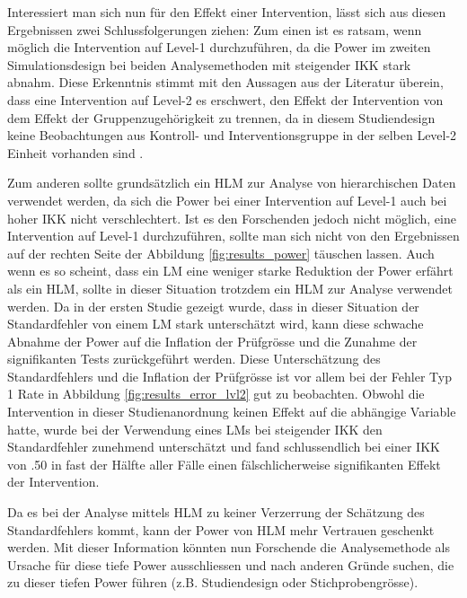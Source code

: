 \documentclass[12pt, a4paper]{article}\usepackage[]{graphicx}\usepackage[]{color}
\begin{document}
Interessiert man sich nun für den Effekt einer Intervention, lässt sich aus diesen Ergebnissen zwei Schlussfolgerungen ziehen: Zum einen ist es ratsam, wenn möglich die Intervention auf Level-1 durchzuführen, da die Power im zweiten Simulationsdesign bei beiden Analysemethoden mit steigender IKK stark abnahm. Diese Erkenntnis stimmt mit den Aussagen aus der Literatur überein, dass eine Intervention auf Level-2 es erschwert, den Effekt der Intervention von dem Effekt der Gruppenzugehörigkeit zu trennen, da in diesem Studiendesign keine Beobachtungen aus Kontroll- und Interventionsgruppe in der selben Level-2 Einheit vorhanden sind \citep{cleary2012studydesign, moerbeek2000design}. 

Zum anderen sollte grundsätzlich ein HLM zur Analyse von hierarchischen Daten verwendet werden, da sich die Power bei einer Intervention auf Level-1 auch bei hoher IKK nicht verschlechtert. Ist es den Forschenden jedoch nicht möglich, eine Intervention auf Level-1 durchzuführen, sollte man sich nicht von den Ergebnissen auf der rechten Seite der Abbildung \ref{fig:results_power} täuschen lassen. Auch wenn es so scheint, dass ein LM eine weniger starke Reduktion der Power erfährt als ein HLM, sollte in dieser Situation trotzdem ein HLM zur Analyse verwendet werden. Da in der ersten Studie gezeigt wurde, dass in dieser Situation der Standardfehler von einem LM stark unterschätzt wird, kann diese schwache Abnahme der Power auf die Inflation der Prüfgrösse und die Zunahme der signifikanten Tests zurückgeführt werden. Diese Unterschätzung des Standardfehlers und die Inflation der Prüfgrösse ist vor allem bei der Fehler Typ 1 Rate in Abbildung \ref{fig:results_error_lvl2} gut zu beobachten. Obwohl die Intervention in dieser Studienanordnung keinen Effekt auf die abhängige Variable hatte, wurde bei der Verwendung eines LMs bei steigender IKK den Standardfehler zunehmend unterschätzt und fand schlussendlich bei einer IKK von .50 in fast der Hälfte aller Fälle einen fälschlicherweise signifikanten Effekt der Intervention.

Da es bei der Analyse mittels HLM zu keiner Verzerrung der Schätzung des Standardfehlers kommt, kann der Power von HLM mehr Vertrauen geschenkt werden. Mit dieser Information könnten nun Forschende die Analysemethode als Ursache für diese tiefe Power ausschliessen und nach anderen Gründe suchen, die zu dieser tiefen Power führen (z.B. Studiendesign oder Stichprobengrösse).
\end{document}
